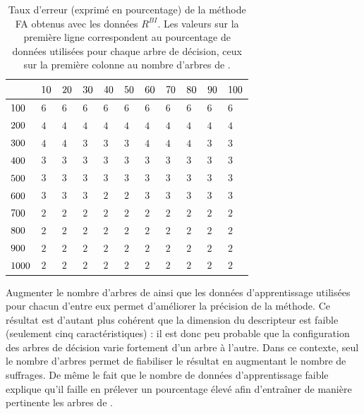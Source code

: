\begin{table}[htb]
\caption{Taux d'erreur (exprimé en pourcentage) de la méthode FA obtenus avec les données $R^{BI}$. Les valeurs sur la première ligne correspondent au pourcentage de données  utilisées pour chaque arbre de décision, ceux sur la première colonne au nombre d'arbres de .}
\centering
\begin{tabular}{| p{0.7cm} | p{0.5cm} |p{0.5cm} |p{0.5cm} |p{0.5cm} |p{0.5cm} |p{0.5cm} |p{0.5cm} |p{0.5cm} |p{0.5cm} |p{0.5cm} |}
\hline
&$\cellcolor{gris}{10}$&$\cellcolor{gris}{20}$&$\cellcolor{gris}{30}$&$\cellcolor{gris}{40}$&$\cellcolor{gris}{50}$&$\cellcolor{gris}{60}$&$\cellcolor{gris}{70}$&$\cellcolor{gris}{80}$&$\cellcolor{gris}{90}$&$\cellcolor{gris}{100}$\\
\hline
$\cellcolor{gris}{100}$ & $6$ & $6$ & $6$ & $6$ & $6$ & $6$ & $6$ & $6$ & $6$ & $6$ \\
\hline
$\cellcolor{gris}{200}$ & $4$ & $4$ & $4$ & $4$ & $4$ & $4$ & $4$ & $4$ & $4$ & $4$ \\
\hline
$\cellcolor{gris}{300}$ & $4$ & $4$ & $3$ & $3$ & $3$ & $4$ & $4$ & $4$ & $3$ & $3$ \\
\hline
$\cellcolor{gris}{400}$ & $3$ & $3$ & $3$ & $3$ & $3$ & $3$ & $3$ & $3$ & $3$ & $3$ \\
\hline
$\cellcolor{gris}{500}$ & $3$ & $3$ & $3$ & $3$ & $3$ & $3$ & $3$ & $3$ & $3$ & $3$ \\
\hline
$\cellcolor{gris}{600}$ & $3$ & $3$ & $3$ & $2$ & $2$ & $3$ & $3$ & $3$ & $3$ & $3$ \\
\hline
$\cellcolor{gris}{700}$ & $2$ & $2$ & $2$ & $2$ & $2$ & $2$ & $2$ & $2$ & $2$ & $2$ \\
\hline
$\cellcolor{gris}{800}$ & $2$ & $2$ & $2$ & $2$ & $2$ & $2$ & $2$ & $2$ & $2$ & $2$ \\
\hline
$\cellcolor{gris}{900}$ & $2$ & $2$ & $2$ & $2$ & $2$ & $2$ & $2$ & $2$ & $2$ & $2$ \\
\hline
$\cellcolor{gris}{1000}$ & $2$ & $2$ & $2$ & $2$ & $2$ & $2$ & $2$ & $2$ & $2$ & $2$ \\
\hline
\end{tabular}
\label{tab:saf:fa_bi_precision}
\end{table}


Augmenter le nombre d'arbres de  ainsi que les données d'apprentissage utilisées pour chacun d'entre eux permet d'améliorer la précision de la méthode. Ce résultat est d'autant plus cohérent que la dimension du descripteur est faible (seulement cinq caractéristiques) : il est donc peu probable que la configuration des arbres de décision varie fortement d'un arbre à l'autre. Dans ce contexte, seul le nombre d'arbres permet de fiabiliser le résultat en augmentant le nombre de suffrages. De même\modif{,} le fait que le nombre de données d'apprentissage  faible explique qu'il faille en prélever un pourcentage élevé afin d'entraîner de manière pertinente les arbres de . 

